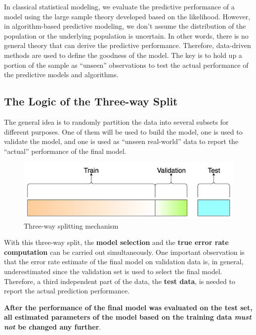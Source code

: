 \documentclass[
]{book}
\begin{document}
In classical statistical modeling, we evaluate the predictive performance of a model using the large sample theory developed based on the likelihood. However, in algorithm-based predictive modeling, we don't assume the distribution of the population or the underlying population is uncertain. In other words, there is no general theory that can derive the predictive performance. Therefore, data-driven methods are used to define the goodness of the model. The key is to hold up a portion of the sample as ``unseen'' observations to test the actual performance of the predictive models and algorithms.

\hypertarget{the-logic-of-the-three-way-split}{%
\subsection{The Logic of the Three-way Split}\label{the-logic-of-the-three-way-split}}

The general idea is to randomly partition the data into several subsets for different purposes. One of them will be used to build the model, one is used to validate the model, and one is used as ``unseen real-world'' data to report the ``actual'' performance of the final model.

\begin{figure}

{\centering \includegraphics[width=0.4\linewidth]{img08/w08-three3WaySplit} 

}

\caption{Three-way splitting mechanism}\label{fig:unnamed-chunk-139}
\end{figure}

With this three-way split, the \textbf{model selection} and the \textbf{true error rate computation} can be carried out simultaneously. One important observation is that the error rate estimate of the final model on validation data is, in general, underestimated since the validation set is used to select the final model. Therefore, a third independent part of the data, the \textbf{test data}, is needed to report the actual prediction performance.

\textbf{After the performance of the final model was evaluated on the test set, all estimated parameters of the model based on the training data \emph{must not} be changed any further}.
\end{document}
